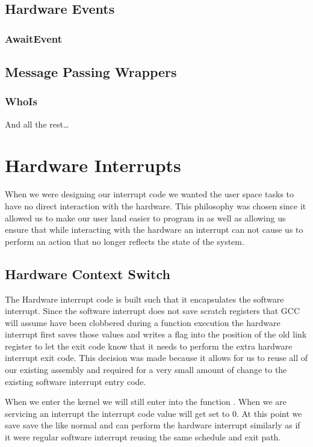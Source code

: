 \documentclass[pdftex,10pt,a4paper]{article}
\begin{document}
\subsection*{Hardware Events}

\subsubsection*{AwaitEvent}

\subsection*{Message Passing Wrappers}

\subsubsection*{WhoIs}

And all the rest\ldots

\section*{Hardware Interrupts}

When we were designing our interrupt code we wanted the user space tasks to
have no direct interaction with the hardware. This philosophy was chosen since
it allowed us to make our user land easier to program in as well as allowing us
ensure that while interacting with the hardware an interrupt can not cause us
to perform an action that no longer reflects the state of the system.

\subsection*{Hardware Context Switch}

The Hardware interrupt code is built such that it encapsulates the software
interrupt. Since the software interrupt does not save scratch registers that
GCC will assume have been clobbered during a function execution the hardware
interrupt first saves those values and writes a flag into the position of the
old link register to let the exit code know that it needs to perform the extra
hardware interrupt exit code. This decision was made because it allows for us
to reuse all of our existing assembly and required for a very small amount of
change to the existing software interrupt entry code.

When we enter the kernel we will still enter into the function
. When we are servicing an interrupt the interrupt code
value will get set to 0. At this point we save save the  like normal
and can perform the hardware interrupt similarly as if it were regular software
interrupt reusing the same schedule and exit path.
\end{document}
